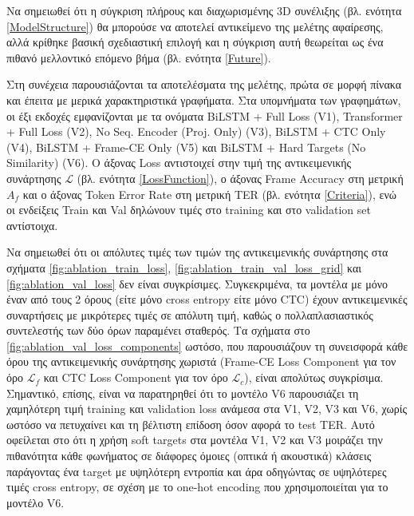 Να σημειωθεί ότι η σύγκριση πλήρους και διαχωρισμένης 3D συνέλιξης (βλ. ενότητα \ref{ModelStructure}) θα μπορούσε να αποτελεί αντικείμενο της μελέτης αφαίρεσης, αλλά κρίθηκε βασική σχεδιαστική επιλογή και η σύγκριση αυτή θεωρείται ως ένα πιθανό μελλοντικό επόμενο βήμα (βλ. ενότητα \ref{Future}).

Στη συνέχεια παρουσιάζονται τα αποτελέσματα της μελέτης, πρώτα σε μορφή πίνακα και έπειτα με μερικά χαρακτηριστικά γραφήματα. Στα υπομνήματα των γραφημάτων, οι έξι εκδοχές εμφανίζονται με τα ονόματα BiLSTM + Full Loss (V1), Transformer + Full Loss (V2), No Seq. Encoder (Proj. Only) (V3), BiLSTM + CTC Only (V4), BiLSTM + Frame-CE Only (V5) και BiLSTM + Hard Targets (No Similarity) (V6). Ο άξονας Loss αντιστοιχεί στην τιμή της αντικειμενικής συνάρτησης $\mathcal{L}$ (βλ. ενότητα \ref{LossFunction}), ο άξονας Frame Accuracy στη μετρική $A_f$ και ο άξονας Token Error Rate στη μετρική TER (βλ. ενότητα \ref{Criteria}), ενώ οι ενδείξεις Train και Val δηλώνουν τιμές στο training και στο validation set αντίστοιχα.

Να σημειωθεί ότι οι απόλυτες τιμές των τιμών της αντικειμενικής συνάρτησης στα σχήματα \ref{fig:ablation_train_loss}, \ref{fig:ablation_train_val_loss_grid} και \ref{fig:ablation_val_loss} δεν είναι συγκρίσιμες. Συγκεκριμένα, τα μοντέλα με μόνο έναν από τους 2 όρους (είτε μόνο cross entropy είτε μόνο CTC) έχουν αντικειμενικές συναρτήσεις με μικρότερες τιμές σε απόλυτη τιμή, καθώς ο πολλαπλασιαστικός συντελεστής των δύο όρων παραμένει σταθερός. Τα σχήματα στο \ref{fig:ablation_val_loss_components} ωστόσο, που παρουσιάζουν τη συνεισφορά κάθε όρου της αντικειμενικής συνάρτησης χωριστά (Frame-CE Loss Component για τον όρο $\mathcal{L}_f$ και CTC Loss Component για τον όρο $\mathcal{L}_c$), είναι απολύτως συγκρίσιμα. Σημαντικό, επίσης, είναι να παρατηρηθεί ότι το μοντέλο V6 παρουσιάζει τη χαμηλότερη τιμή training και validation loss ανάμεσα στα V1, V2, V3 και V6, χωρίς ωστόσο να πετυχαίνει και τη βέλτιστη επίδοση όσον αφορά το test TER. Αυτό οφείλεται στο ότι η χρήση soft targets στα μοντέλα V1, V2 και V3 μοιράζει την πιθανότητα κάθε φωνήματος σε διάφορες όμοιες (οπτικά ή ακουστικά) κλάσεις παράγοντας ένα target με υψηλότερη εντροπία και άρα οδηγώντας σε υψηλότερες τιμές cross entropy, σε σχέση με το one-hot encoding που χρησιμοποιείται για το μοντέλο V6.


